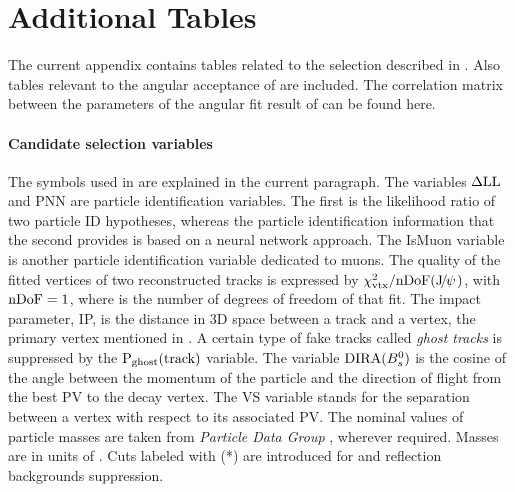 
\chapter{Additional Tables}
\label{AdditionalTables}

The current appendix contains tables related to the selection described in .
Also tables relevant to the angular acceptance of  are included.
The correlation matrix between the parameters of the angular fit result of  can be found here.

\subsubsection{Candidate selection variables}
The symbols used in  are explained in the current paragraph.
The variables $\rm \Delta LL$ and PNN are particle identification variables. The first is the
likelihood ratio of two particle ID hypotheses, whereas the particle identification information
that the second provides is based on a neural network approach. The IsMuon variable is another
particle identification variable dedicated to muons. The quality of the fitted vertices
of two reconstructed tracks is expressed by $\chi^2_{\rm vtx}/\rm nDoF({J\mskip -3mu/\mskip -2mu\psi\mskip 2mu})$, with $\rm nDoF=1$, where \nDoF
is the number of degrees of freedom of that fit. The impact parameter, IP, is the distance in
3D space between a track and a vertex, \eg the primary vertex mentioned in .
A certain type of fake tracks called {\it ghost tracks} is suppressed by the $\text{P}_{\rm ghost}(\rm track)$
variable. The variable ${\rm DIRA}(B^0_s)$ is the cosine of the angle between the momentum of the \Bs particle
and the direction of flight from the best PV to the \Bs decay vertex. The VS variable stands for
the separation between a vertex with respect to its associated PV. The nominal values of particle
masses are taken from {\it Particle Data Group} \cite{PDG}, wherever required. Masses are in units
of \mevcc. Cuts labeled with (*) are introduced for \LbJpsipK and \LbJpsippi reflection backgrounds suppression.


